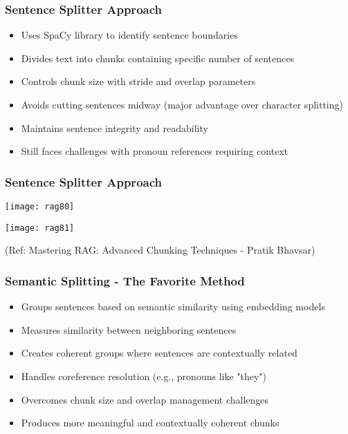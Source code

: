 \begin{frame}[fragile]\frametitle{Sentence Splitter Approach}
      \begin{itemize}
\item Uses SpaCy library to identify sentence boundaries
\item Divides text into chunks containing specific number of sentences
\item Controls chunk size with stride and overlap parameters
\item Avoids cutting sentences midway (major advantage over character splitting)
\item Maintains sentence integrity and readability
\item Still faces challenges with pronoun references requiring context
  \end{itemize}
\end{frame}

\begin{frame}[fragile]\frametitle{Sentence Splitter Approach}

  
  	\begin{center}
	\texttt{[image: rag80]}
	
	\texttt{[image: rag81]}
	
	{\tiny (Ref: Mastering RAG: Advanced Chunking Techniques - Pratik Bhavsar)}
	
	\end{center}
\end{frame}


\begin{frame}[fragile]\frametitle{Semantic Splitting - The Favorite Method}
      \begin{itemize}
\item Groups sentences based on semantic similarity using embedding models
\item Measures similarity between neighboring sentences
\item Creates coherent groups where sentences are contextually related
\item Handles coreference resolution (e.g., pronouns like "they")
\item Overcomes chunk size and overlap management challenges
\item Produces more meaningful and contextually coherent chunks
  \end{itemize}
\end{frame}

